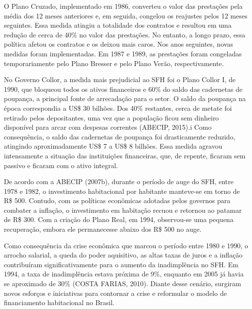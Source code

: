 \documentclass[
  12pt,
  a4paper,
]{scrreprt}
\begin{document}
O Plano Cruzado, implementado em 1986, converteu o valor das prestações
pela média dos 12 meses anteriores e, em seguida, congelou os reajustes
pelos 12 meses seguintes. Essa medida atingiu a totalidade dos contratos
e resultou em uma redução de cerca de 40\% no valor das prestações. No
entanto, a longo prazo, essa política afetou os contratos e os deixou
mais caros. Nos anos seguintes, novas medidas foram implementadas. Em
1987 e 1989, as prestações foram congeladas temporariamente pelo Plano
Bresser e pelo Plano Verão, respectivamente.

\vspace{12pt}

No Governo Collor, a medida mais prejudicial ao SFH foi o Plano Collor
I, de 1990, que bloqueou todos os ativos financeiros e 60\% do saldo das
cadernetas de poupança, a principal fonte de arrecadação para o setor. O
saldo da poupança na época correspondia a US\$ 30 bilhões. Dos 40\%
restantes, cerca de metate foi retirado pelos depositantes, uma vez que
a população ficou sem dinheiro disponível para arcar com despesas
correntes (ABECIP, 2015).i Como consequência, o saldo das cadernetas de
poupança foi drasticamente reduzido, atingindo aproximadamente US\$ 7 a
US\$ 8 bilhões. Essa medida agravou intensamente a situação das
instituições financeiras, que, de repente, ficaram sem passivo e ficaram
com o ativo integral.

\vspace{12pt}

De acordo com a ABECIP (2007b), durante o período de auge do SFH, entre
1978 e 1982, o investimento habitacional por habitante manteve-se em
torno de R\$ 500. Contudo, com as políticas econômicas adotadas pelos
governos para combater a inflação, o investimento em habitação recuou e
retornou ao patamar de R\$ 300. Com a criação do Plano Real, em 1994,
observou-se uma pequena recuperação, embora ele permanecesse abaixo dos
R\$ 500 no auge.

\vspace{12pt}

Como consequência da crise econômica que marcou o período entre 1980 e
1990, o arrocho salarial, a queda do poder aquisitivo, as altas taxas de
juros e a inflação contribuíram significativamente para o aumento da
inadimplência no SFH. Em 1994, a taxa de inadimplência estava próxima de
9\%, enquanto em 2005 já havia se aproximado de 30\% (COSTA FARIAS,
2010). Diante desse cenário, surgiram novos esforços e iniciativas para
contornar a crise e reformular o modelo de financiamento habitacional no
Brasil.
\end{document}
